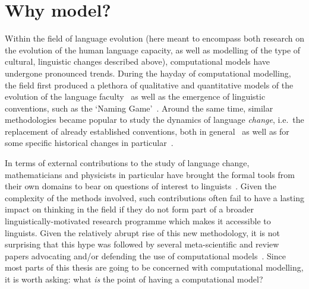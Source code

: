 \section{Why model?}

Within the field of language evolution (here meant to encompass both research on the evolution of the human language capacity, as well as modelling of the type of cultural, linguistic changes described above), computational models have undergone pronounced trends. %
During the hayday of computational modelling, the field first produced a plethora of qualitative and quantitative models of the evolution of the language faculty~\citep{Kirby1999,Nowak2001a} as well as the emergence of linguistic conventions, such as the `Naming Game'~\citep{Baronchelli2008}. Around the same time, similar methodologies became popular to study the dynamics of language \emph{change}, i.e.~the replacement of already established conventions, both in general~\citep{Niyogi1995,Niyogi1997,Arita1998,Nettle1999,Kataoka2000,Livingstone2000,Ritt2004,DeOliveira2005,Niyogi2006,Wedel2006,Baxter2006,Wedel2007,Ettlinger2007b,Ettlinger2007,Fagyal2010,Blythe2012,Gong2012,Otero-Espinar2013,Soskuthy2013,Pierrehumbert2014,Enke2016,Kauhanen2015} as well as for some specific historical changes in particular~\citep{Yang2002,Choudhury2006,Choudhury2007,Pearl2007,Troutman2008,Baxter2009,Sonderegger2010,Swarup2012,Ritt2012,Kirby2013,Kirby2013cogsci}.

In terms of external contributions to the study of language change, mathematicians and physicists in particular have brought the formal tools from their own domains to bear on questions of interest to linguists~\citep{Castellano2009,Blythe2015}. Given the complexity of the methods involved, such contributions often fail to have a lasting impact on thinking in the field if they do not form part of a broader linguistically-motivated research programme which makes it accessible to linguists. %
Given the relatively abrupt rise of this new methodology, it is not surprising that this hype was followed by several meta-scientific and review papers advocating and/or defending the use of computational models~\citep{Cangelosi2002,Wang2004,DeBoer2006,Baker2008,Jaeger2009,Hruschka2009,Vogt2010,DeBoer2012EvoLang,Smith2016}.
Since most parts of this thesis are going to be concerned with computational modelling, it is worth asking: what \emph{is} the point of having a computational model?

